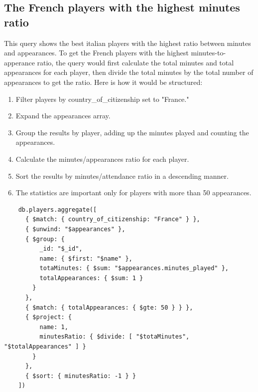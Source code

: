 \documentclass{Configuration_Files/PoliMi3i_thesis}
\begin{document}
\subsection{The French players with the highest minutes ratio}
This query shows the best italian players with the highest ratio between minutes and appearances.
To get the French players with the highest minutes-to-apperance ratio, the query would first calculate the total minutes and total appearances for each player, then divide the total minutes by the total number of appearances to get the ratio. Here is how it would be structured:
\begin{enumerate}
    \item Filter players by country\_of\_citizenship set to "France."
    \item Expand the appearances array.
    \item Group the results by player, adding up the minutes played and counting the appearances.
    \item Calculate the minutes/appearances ratio for each player.
    \item Sort the results by minutes/attendance ratio in a descending manner.
    \item The statistics are important only for players with more than 50 appearances.
\end{enumerate}
\newpage
\begin{verbatim}
    db.players.aggregate([
      { $match: { country_of_citizenship: "France" } },
      { $unwind: "$appearances" },
      { $group: { 
          _id: "$_id", 
          name: { $first: "$name" }, 
          totaMinutes: { $sum: "$appearances.minutes_played" }, 
          totalAppearances: { $sum: 1 }
        } 
      },
      { $match: { totalAppearances: { $gte: 50 } } },
      { $project: { 
          name: 1, 
          minutesRatio: { $divide: [ "$totaMinutes", "$totalAppearances" ] }
        } 
      },
      { $sort: { minutesRatio: -1 } }
    ])
\end{verbatim}
\end{document}
